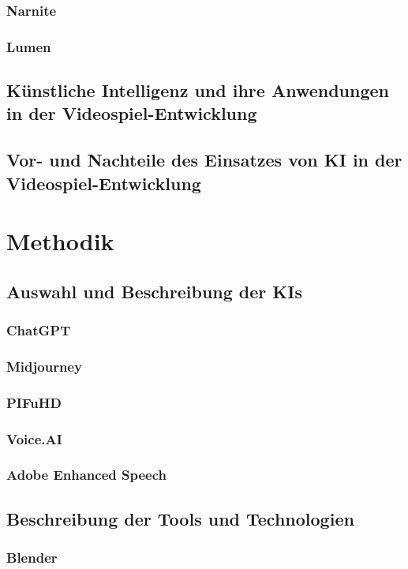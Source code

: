 \documentclass[12pt,a4paper,bibliography=totocnumbered,listof=totocnumbered]{scrartcl}
\begin{document}
\subsubsection{Narnite}
\subsubsection{Lumen}
\subsection{Künstliche Intelligenz und ihre Anwendungen in der Videospiel-Entwicklung}
\subsection{Vor- und Nachteile des Einsatzes von KI in der Videospiel-Entwicklung}

\section{Methodik}
\subsection{Auswahl und Beschreibung der KIs}
\subsubsection{ChatGPT}
\subsubsection{Midjourney}
\subsubsection{PIFuHD}
\subsubsection{Voice.AI}
\subsubsection{Adobe Enhanced Speech}

\subsection{Beschreibung der Tools und Technologien}
\subsubsection{Blender}
\end{document}
